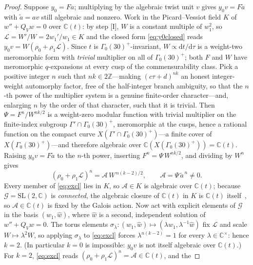 \documentclass[11pt]{article}
\newcommand{\rmd}{\mathrm{d}}
\theoremstyle{plain}
\theoremstyle{remark}
\begin{document}
\begin{proof}
Suppose $y_0=Fa$; multiplying by the algebraic twist unit $v$ gives
$y_0v=F\tilde a$ with $\tilde a=av$ still algebraic and nonzero. Work in the Picard--Vessiot
field $K$ of $w''+Q_Vw=0$ over $\mathbb{C}(t)$: by step [I], $W$ is a constant multiple of
$w_1^2$, so $\mathcal{L}=W'/W=2w_1'/w_1\in K$ and the closed form \eqref{eq:y0closed} reads
$y_0v=W(\rho_0+\rho_1\mathcal{L})$. Since $t$ is $\Gamma_0(30)^+$-invariant,
$W\propto\rmd t/\rmd\tau$ is a weight-two meromorphic form with \emph{trivial} multiplier on
all of $\Gamma_0(30)^+$; both $F$ and $W$ have meromorphic $q$-expansions at every cusp of the
commensurability class. Pick a positive integer $n$ such that $nk\in2\mathbb{Z}$---making
$(c\tau+d)^{nk}$ an honest integer-weight automorphy factor, free of the half-integer branch
ambiguity, so that the $n$-th power of the multiplier system is a genuine finite-order
character---and, enlarging $n$ by the order of that character, such that it is trivial. Then
$\Psi=F^n/W^{nk/2}$ is a weight-zero modular function with trivial
multiplier on the finite-index subgroup $\Gamma'\cap\Gamma_0(30)^+$, meromorphic at the cusps,
hence a rational function on the compact curve $X(\Gamma'\cap\Gamma_0(30)^+)$---a finite cover
of $X(\Gamma_0(30)^+)$---and therefore algebraic over
$\mathbb{C}(X(\Gamma_0(30)^+))=\mathbb{C}(t)$. Raising $y_0v=F\tilde a$ to the $n$-th power,
inserting $F^n=\Psi\,W^{nk/2}$, and dividing by $W^n$ gives
\begin{equation}
(\rho_0+\rho_1\mathcal{L})^n=\mathcal{A}\,W^{\,n(k-2)/2},\qquad
\mathcal{A}=\Psi\,\tilde a^{\,n}\neq0.
\label{eq:excl}
\end{equation}
Every member of \eqref{eq:excl} lies in $K$, so $\mathcal{A}\in K$ is algebraic over
$\mathbb{C}(t)$; because $\mathcal{G}=\mathrm{SL}(2,\mathbb{C})$ is \emph{connected}, the
algebraic closure of $\mathbb{C}(t)$ in $K$ is $\mathbb{C}(t)$ itself~\cite{vdPutSinger}, so
$\mathcal{A}\in\mathbb{C}(t)$ is fixed by the Galois action. Now act with explicit elements
of $\mathcal{G}$ in the basis $(w_1,\hat w)$, where $\hat w$ is a second, independent solution of $w''+Q_Vw=0$. The torus elements
$\sigma_\lambda:(w_1,\hat w)\mapsto(\lambda w_1,\lambda^{-1}\hat w)$ fix $\mathcal{L}$ and scale
$W\mapsto\lambda^2W$, so applying $\sigma_\lambda$ to \eqref{eq:excl} forces
$\lambda^{n(k-2)}=1$ for every $\lambda\in\mathbb{C}^\times$: hence $k=2$. (In particular
$k=0$ is impossible: $y_0v$ is not itself algebraic over $\mathbb{C}(t)$.) For $k=2$,
\eqref{eq:excl} reads $(\rho_0+\rho_1\mathcal{L})^n=\mathcal{A}\in\mathbb{C}(t)$, and the

\end{proof}
\end{document}
